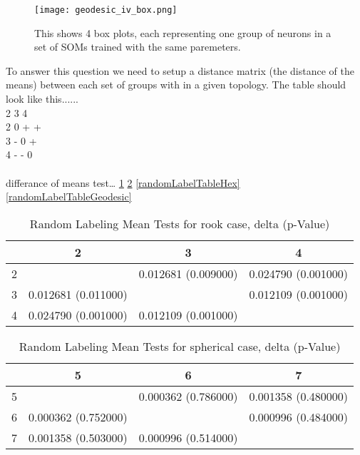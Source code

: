 \begin{figure}
\centering
\texttt{[image: geodesic\_iv\_box.png]}
\caption{This shows 4 box plots, each representing one group of neurons in a set
of SOMs trained with the same paremeters.}
\label{fGeodesicIV}
\end{figure}




To answer this question we need to setup a distance matrix (the distance of the
means) between each set of groups with in a given topology.  The table should
look like this...... 
\\
  2 3 4\\
2 0 + +\\
3 - 0 +\\
4 - - 0\\
\\
differance of means test\ldots
\ref{randomLabelTableRook}
\ref{randomLabelTableGraph}
\ref{randomLabelTableHex}
\ref{randomLabelTableGeodesic}

\begin{table}
\centering
\caption{Random Labeling Mean Tests for rook case,  delta (p-Value)}
\label{randomLabelTableRook}
\begin{tabular}{|c||c|c|c|}
\hline
&2&3&4\\
\hline
\hline
2& & 0.012681 (0.009000)& 0.024790 (0.001000)\\
\hline
3& 0.012681 (0.011000)& & 0.012109 (0.001000)\\
\hline
4& 0.024790 (0.001000)& 0.012109 (0.001000)& \\
\hline
\end{tabular} \end{table}


\begin{table}
\centering
\caption{Random Labeling Mean Tests for spherical case,  delta (p-Value)}
\label{randomLabelTableGraph}
\begin{tabular}{|c||c|c|c|}
\hline
&5&6&7\\
\hline
\hline
5& & 0.000362 (0.786000)& 0.001358 (0.480000)\\
\hline
6& 0.000362 (0.752000)& & 0.000996 (0.484000)\\
\hline
7& 0.001358 (0.503000)& 0.000996 (0.514000)& \\
\hline
\end{tabular} \end{table}

